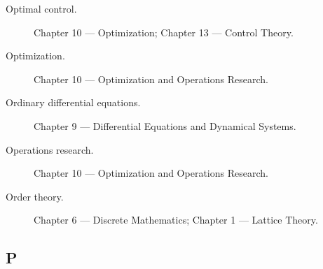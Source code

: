 \begin{description}

\item[Optimal control.]
Chapter 10 --- Optimization;
Chapter 13 --- Control Theory.

\item[Optimization.]
Chapter 10 --- Optimization and Operations Research.

\item[Ordinary differential equations.]
Chapter 9 --- Differential Equations and Dynamical Systems.

\item[Operations research.]
Chapter 10 --- Optimization and Operations Research.

\item[Order theory.]
Chapter 6 --- Discrete Mathematics;
Chapter 1 --- Lattice Theory.

\end{description}

\subsection*{P}


